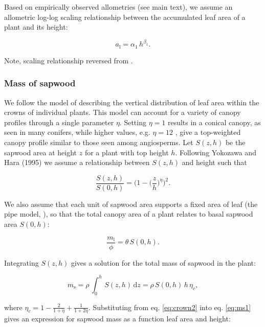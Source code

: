 \documentclass[12pt, a4paper]{article}
\begin{document}
Based on empirically observed allometries (see main text), we assume an
allometric log-log scaling relationship between the accumulated leaf
area of a plant and its height:

\begin{equation}\label{eq:ha}
a_\textrm{l}=\alpha_1 \, h^{\beta_1}.
\end{equation}

Note, scaling relationship reversed from \citep{falster-2011}.

\subsubsection{Mass of sapwood}\label{mass-of-sapwood}

We follow the model of\citep{yokozawa-1995} describing the
vertical distribution of leaf area within the crowns of individual
plants. This model can account for a variety of canopy profiles through
a single parameter \(\eta\). Setting \(\eta=1\) results in a conical
canopy, as seen in many conifers, while higher values, e.g. \(\eta=12\)
, give a top-weighted canopy profile similar to those seen among
angiosperms. Let \(S(z,h)\) be the sapwood area at height \(z\) for a
plant with top height \(h\). Following Yokozawa and Hara (1995) we
assume a relationship between \(S(z,h)\) and height such that

\begin{equation}\label{eq:crown1}
\frac{S(z,h)}{S(0,h)}= \big(1-\big(\frac{z}{h}\big)^\eta\big)^2.
\end{equation}

We also assume that each unit of sapwood area supports a fixed area of
leaf (the pipe model, \citep{shinozaki-1964}), so that the total
canopy area of a plant relates to basal sapwood area \(S(0,h)\):

\begin{equation}\label{eq:crown2}
\frac{m_\textrm{l}}{\phi}= \theta \, S(0,h).
\end{equation}

Integrating \(S(z,h)\) gives a solution for the total mass of sapwood in
the plant:

\begin{equation}\label{eq:ms1}
m_\textrm{s}=\rho \, \int_0^h \, S(z,h) \, \textrm{d}z= \rho \, S(0,h) \, h \, \eta_c, \end{equation}

where
\(\eta_c=1-\frac{2}{1+\eta} + \frac{1}{1+2\eta}\)\citep{yokozawa-1995}.
Substituting from eq. \ref{eq:crown2} into eq. \ref{eq:ms1} gives an
expression for sapwood mass as a function leaf area and height:
\end{document}

